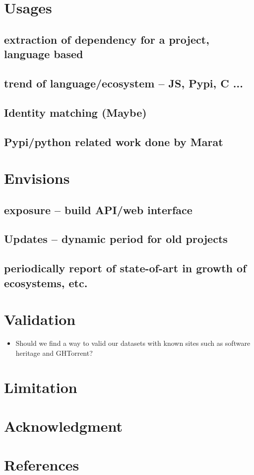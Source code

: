 \documentclass[conference]{IEEEtran}
\begin{document}
\section{Usages}
\subsection{extraction of dependency for a project, language based}
\subsection{trend of language/ecosystem -- JS, Pypi, C ...}
\subsection{Identity matching (Maybe)}
\subsection{Pypi/python related work done by Marat}

\section{Envisions}
\subsection{exposure -- build API/web interface}
\subsection{Updates -- dynamic period for old projects}
\subsection{periodically report of state-of-art in growth of ecosystems, etc.}

\section{Validation}
\begin{itemize}
    \item Should we find a way to valid our datasets with known sites such as software heritage and GHTorrent?
\end{itemize}

\section{Limitation}

\section*{Acknowledgment}
\section*{References}
\end{document}

